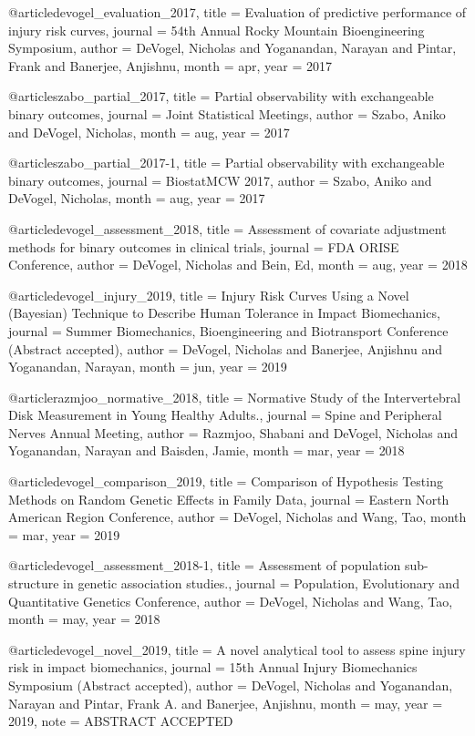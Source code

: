 
@article{devogel_evaluation_2017,
	title = {Evaluation of predictive performance of injury risk curves},
	journal = {54th Annual Rocky Mountain Bioengineering Symposium},
	author = {DeVogel, Nicholas and Yoganandan, Narayan and Pintar, Frank and Banerjee, Anjishnu},
	month = apr,
	year = {2017}
}

@article{szabo_partial_2017,
	title = {Partial observability with exchangeable binary outcomes},
	journal = {Joint Statistical Meetings},
	author = {Szabo, Aniko and DeVogel, Nicholas},
	month = aug,
	year = {2017}
}

@article{szabo_partial_2017-1,
	title = {Partial observability with exchangeable binary outcomes},
	journal = {BiostatMCW 2017},
	author = {Szabo, Aniko and DeVogel, Nicholas},
	month = aug,
	year = {2017}
}

@article{devogel_assessment_2018,
	title = {Assessment of covariate adjustment methods for binary outcomes in clinical trials},
	journal = {FDA ORISE Conference},
	author = {DeVogel, Nicholas and Bein, Ed},
	month = aug,
	year = {2018}
}

@article{devogel_injury_2019,
	title = {Injury {Risk} {Curves} {Using} a {Novel} ({Bayesian}) {Technique} to {Describe} {Human} {Tolerance} in {Impact} {Biomechanics}},
	journal = {Summer Biomechanics, Bioengineering and Biotransport Conference (Abstract accepted)},
	author = {DeVogel, Nicholas and Banerjee, Anjishnu and Yoganandan, Narayan},
	month = jun,
	year = {2019}
}

@article{razmjoo_normative_2018,
	title = {Normative {Study} of the {Intervertebral} {Disk} {Measurement} in {Young} {Healthy} {Adults}.},
	journal = {Spine and Peripheral Nerves Annual Meeting},
	author = {Razmjoo, Shabani and DeVogel, Nicholas and Yoganandan, Narayan and Baisden, Jamie},
	month = mar,
	year = {2018}
}

@article{devogel_comparison_2019,
	title = {Comparison of {Hypothesis} {Testing} {Methods} on {Random} {Genetic} {Effects} in {Family} {Data}},
	journal = {Eastern North American Region Conference},
	author = {DeVogel, Nicholas and Wang, Tao},
	month = mar,
	year = {2019}
}

@article{devogel_assessment_2018-1,
	title = {Assessment of population sub-structure in genetic association studies.},
	journal = {Population, Evolutionary and Quantitative Genetics Conference},
	author = {DeVogel, Nicholas and Wang, Tao},
	month = may,
	year = {2018}
}

@article{devogel_novel_2019,
	title = {A novel analytical tool to assess spine injury risk in impact biomechanics},
	journal = {15th Annual Injury Biomechanics Symposium (Abstract accepted)},
	author = {DeVogel, Nicholas and Yoganandan, Narayan and Pintar, Frank A. and Banerjee, Anjishnu},
	month = may,
	year = {2019},
	note = {ABSTRACT ACCEPTED}
}

